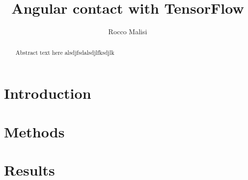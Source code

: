 \documentclass[letterpaper,10pt]{article}
\title{Angular contact with TensorFlow}
\author{Rocco Malisi}
\begin{document}
	\maketitle
	\newpage
	
	\begin{abstract}
		Abstract text here alsdjfsdalsdjlfksdjlk
	\end{abstract}
	\newpage
	
	\tableofcontents
	\newpage
	
	\section{Introduction}
	\section{Methods}
	\section{Results}
\end{document}

